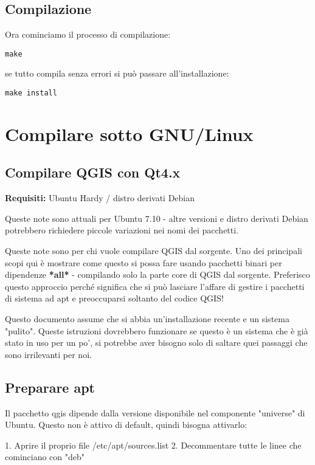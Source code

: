 \subsection{Compilazione}
Ora cominciamo il processo di compilazione:

\begin{verbatim}
make 
\end{verbatim}

se tutto compila senza errori si può passare all'installazione:

\begin{verbatim}
make install 
\end{verbatim}

\section{Compilare sotto GNU/Linux}\label{sec:install_linux}
\subsection{Compilare QGIS con Qt4.x}
\textbf{Requisiti:} Ubuntu Hardy / distro derivati Debian 

Queste note sono attuali per Ubuntu 7.10 - altre versioni e distro derivati Debian potrebbero richiedere piccole variazioni nei nomi dei pacchetti.

Queste note sono per chi vuole compilare QGIS dal sorgente. Uno dei principali scopi qui è mostrare come questo si possa fare usando pacchetti binari per dipendenze \textbf{*all*} - compilando solo la parte core di QGIS dal sorgente. Preferisco questo approccio perché significa che si può lasciare l'affare di gestire i pacchetti di sistema ad apt e preoccuparsi soltanto del codice QGIS! 

Questo documento assume che si abbia un'installazione recente e un sistema "pulito". Queste istruzioni dovrebbero funzionare se questo è un sistema che è già stato in uso per un po', si potrebbe aver bisogno solo di saltare quei passaggi che sono irrilevanti per noi.

\subsection{Preparare apt}
Il pacchetto qgis dipende dalla versione disponibile nel componente "universe" di Ubuntu. Questo non è attivo di default, quindi bisogna attivarlo:

1. Aprire il proprio file /etc/apt/sources.list
2. Decommentare tutte le linee che cominciano con "deb"

